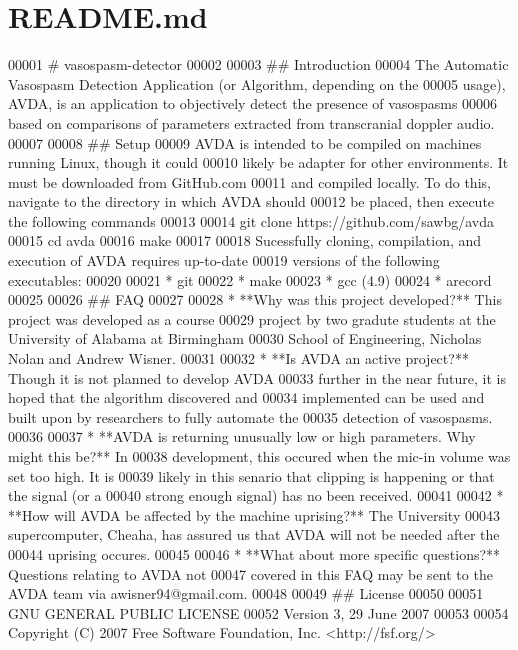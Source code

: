 \hypertarget{README_8md_source}{\section{R\+E\+A\+D\+M\+E.\+md}
}

\begin{DoxyCode}
00001 # vasospasm-detector
00002 
00003 ## Introduction
00004 The Automatic Vasospasm Detection Application (or Algorithm, depending on the
00005 usage), AVDA, is an application to objectively detect the presence of vasospasms
00006 based on comparisons of parameters extracted from transcranial doppler audio.
00007 
00008 ## Setup
00009 AVDA is intended to be compiled on machines running Linux, though it could
00010 likely be adapter for other environments. It must be downloaded from GitHub.com
00011 and compiled locally. To do this, navigate to the directory in which AVDA should
00012 be placed, then execute the following commands
00013 
00014    git clone https://github.com/sawbg/avda
00015    cd avda
00016    make
00017 
00018 Sucessfully cloning, compilation, and execution of AVDA requires up-to-date
00019 versions of the following executables:
00020 
00021 * git
00022 * make
00023 * gcc (4.9)
00024 * arecord
00025 
00026 ## FAQ
00027 
00028 * **Why was this project developed?** This project was developed as a course 
00029 project by two gradute students at the University of Alabama at Birmingham
00030 School of Engineering, Nicholas Nolan and Andrew Wisner.
00031 
00032 * **Is AVDA an active project?** Though it is not planned to develop AVDA
00033 further in the near future, it is hoped that the algorithm discovered and
00034 implemented can be used and built upon by researchers to fully automate the
00035 detection of vasospasms.
00036 
00037 * **AVDA is returning unusually low or high parameters. Why might this be?** In
00038   development, this occured when the mic-in volume was set too high. It is
00039 likely in this senario that clipping is happening or that the signal (or a
00040 strong enough signal) has no been received.
00041 
00042 * **How will AVDA be affected by the machine uprising?** The University
00043   supercomputer, Cheaha, has assured us that AVDA will not be needed after the
00044 uprising occures.
00045 
00046 * **What about more specific questions?** Questions relating to AVDA not
00047 covered in this FAQ may be sent to the AVDA team via awisner94@gmail.com.
00048 
00049 ## License
00050 
00051                     GNU GENERAL PUBLIC LICENSE
00052                        Version 3, 29 June 2007
00053 
00054  Copyright (C) 2007 Free Software Foundation, Inc. <http://fsf.org/>

\end{DoxyCode}
